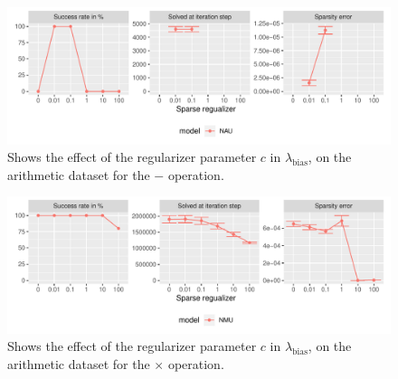 \begin{figure}[h]
\centering
\includegraphics[width=\linewidth]{results/simple_function_static_regualization_sub.pdf}
\caption{Shows the effect of the regularizer parameter $c$ in  $\lambda_{\mathrm{bias}}$, on the arithmetic dataset for the $\bm{-}$ operation.}
\label{fig:simple-fnction-static-regularizer-sub}
\end{figure}

\begin{figure}[h]
\centering
\includegraphics[width=\linewidth]{results/simple_function_static_regualization_mul.pdf}
\caption{Shows the effect of the regularizer parameter $c$ in $\lambda_{\mathrm{bias}}$, on the arithmetic dataset for the $\bm{\times}$ operation.}
\label{fig:simple-fnction-static-regularizer-mul}
\end{figure}

